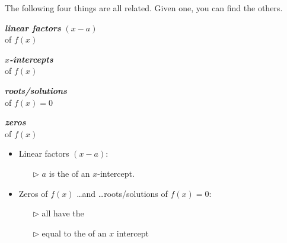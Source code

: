 


\begin{myConcept}{The following four things are all related. Given one, you can find the others.}
\begin{tcbraster}[
    raster columns=2, raster rows=2,
    raster left skip=0.75in, raster right skip=0.75in,
    raster column skip = 0.5in, raster row skip = 0.45in,
    raster equal height, 
    valign=center,
]
    \begin{tcolorbox}
        \begin{center}
            {\bfseries\itshape linear factors} {$(x-a)$}\\[0.25em]
            of $f(x)$
        \end{center}
    \end{tcolorbox}
    \begin{tcolorbox}
        \begin{center}
            {\bfseries\itshape $x$-intercepts}\\
            of $f(x)$
        \end{center}
    \end{tcolorbox}
    \begin{tcolorbox}
        \begin{center}
            {\bfseries\itshape roots/solutions}\\
            of
            $f(x)=0$
        \end{center}
    \end{tcolorbox}
    \begin{tcolorbox}
        \begin{center}
            {\bfseries\itshape zeros}\\ 
            of $f(x)$
        \end{center}
    \end{tcolorbox}
\end{tcbraster}

\begin{itemize}[fullwidth]
    \item Linear factors $(x-a)$:
    \begin{itemize}
        \item[$\rhd$] $a$ is the  of an $x$-intercept.
    \end{itemize}
\item Zeros of $f(x)$ \dots and \dots roots/solutions of $f(x)=0$:
        \begin{itemize}
            \item[$\rhd$] all have the  
            \item[$\rhd$] equal to the  of an $x$ intercept
        \end{itemize}
\end{itemize}
\end{myConcept}
